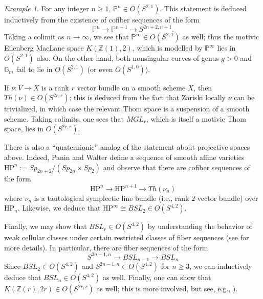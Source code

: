 \documentclass[11pt,leqno]{article}
\newcommand{\Z}{{\mathbb Z}}
\renewcommand{\1}{{\rm 1\hspace*{-0.4ex}%
\rule{0.1ex}{1.52ex}\hspace*{0.2ex}}}
\newcommand{\gm}[1]{{{\mathbb G}_{m}^{#1}}}
\newcommand{\<}[1]{{\langle}#1 {\rangle}}
\theoremstyle{plain}
\theoremstyle{definition}
\theoremstyle{remark}
\newtheorem{ex}[theorem]{Example}
\numberwithin{equation}{subsection}
\begin{document}
\begin{ex}
	\label{ex:cellularclassBSLr}
For any integer $n \geq 1$, ${\mathbb P}^n \in O(S^{2,1})$.  This statement is deduced inductively from the existence of cofiber sequences of the form 
\[
{\mathbb P}^{n} \longrightarrow {\mathbb P}^{n+1} \longrightarrow S^{2n+2,n+1}.
\]
Taking a colimit as $n \to \infty$, we see that ${\mathbb P}^{\infty} \in O(S^{2,1})$ as well; thus the motivic Eilenberg MacLane space $K(\Z(1),2)$, which is modelled by ${\mathbb P}^{\infty}$ lies in $O(S^{2,1})$ also.  On the other hand, both nonsingular curves of genus $g > 0$ and $\gm{}$ fail to lie in $O(S^{2,1})$ (or even $O(S^{1,0})$).

If $\nu: V \to X$ is a rank $r$ vector bundle on a smooth scheme $X$, then $Th(\nu) \in O(S^{2r,r})$: this is deduced from the fact that Zariski locally $\nu$ can be trivialized, in which case the relevant Thom space is a suspension of a smooth scheme.  Taking colimits, one sees that $MGL_r$, which is itself a motivic Thom space, lies in $O(S^{2r,r})$.  

There is also a ``quaternionic'' analog of the statement about projective spaces above.  Indeed, Panin and Walter define a sequence of smooth affine varieties $\mathrm{HP}^n := Sp_{2n+2}/(Sp_{2n} \times Sp_2)$ and observe that there are cofiber sequences of the form
\[
\mathrm{HP}^n \longrightarrow \mathrm{HP}^{n+1} \longrightarrow Th(\nu_{n})
\]
where $\nu_n$ is a tautological symplectic line bundle (i.e., rank $2$ vector bundle) over $\mathrm{HP}_n$.  Likewise, we deduce that $\mathrm{HP}^{\infty} \cong BSL_2 \in O(S^{4,2})$.

Finally, we may show that $BSL_r \in O(S^{4,2})$ by understanding the behavior of weak cellular classes under certain restricted classes of fiber sequences (see \cite[Proposition 3.1.23]{ABHFreudenthal} for more details).  In particular, there are fiber sequences of the form
\[
S^{2n-1,n} \longrightarrow BSL_{n-1} \longrightarrow BSL_n 
\]
Since $BSL_2 \in O(S^{4,2})$ and $S^{2n-1,n} \in O(S^{4,2})$ for $n \geq 3$, we can inductively deduce that $BSL_n \in O(S^{4,2})$ as well.  Finally, one can show that $K(\Z(r),2r) \in O(S^{2r,r})$ as well; this is more involved, but see, e.g., \cite[Example 3.3.8]{ABHFreudenthal}).
\end{ex}
\end{document}
